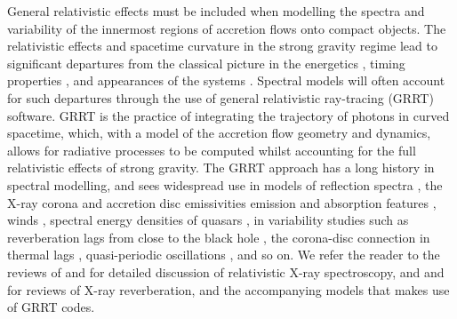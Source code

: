 \documentclass[fleqn,usenatbib]{mnras}
\begin{document}
General relativistic effects must be included when modelling the spectra and
variability of the innermost regions of accretion flows onto compact objects.
The relativistic effects and spacetime curvature in the strong gravity regime
lead to significant departures from the classical picture in the energetics
\citep{cunningham_optical_1973, fabian_long_2002}, timing properties
\citep{stella_measuring_1990, reynolds_x-ray_1999}, and appearances of the
systems \citep{luminet_image_1979}. Spectral models will often account for such
departures through the use of general relativistic ray-tracing (GRRT) software.
GRRT is the practice of integrating the trajectory of photons in curved
spacetime, which, with a model of the accretion flow geometry and dynamics,
allows for radiative processes to be computed whilst accounting for the full
relativistic effects of strong gravity. The GRRT approach has a long history in
spectral modelling, and sees widespread use in models of reflection spectra
\citep[e.g.][]{fabian_x-ray_1989}, the X-ray corona and accretion disc
emissivities \citep[e.g.][]{wilkins_understanding_2012, wilkins_towards_2016}
emission and absorption features \citep[e.g.][]{ruszkowski_absorption_2002},
winds \citep[e.g.][]{juranova_absorption_timing_2022}, spectral energy
densities of quasars \citep[e.g.][]{hagen_estimating_2023}, in variability
studies such as reverberation lags from close to the black hole
\citep[e.g.][]{ingram_public_2019}, the corona-disc connection in thermal lags
\citep[e.g.][]{kammoun_hard_2019}, quasi-periodic oscillations \citep[QPOs,
e.g.][]{tsang_iron_2013}, and so on.  We refer the reader to the reviews of
\citet{reynolds_iron_lines_2003} and \citet{reynolds_observational_2021} for
detailed discussion of relativistic X-ray spectroscopy, and
\citet{uttley_x-ray_2014} and \citet{cackett_reverberation_2021} for reviews of
X-ray reverberation, and the accompanying models that makes use of GRRT codes.
\end{document}
